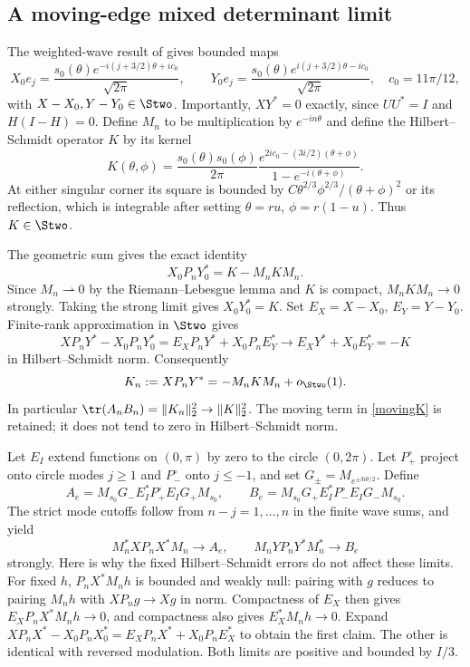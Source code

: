 \subsection{A moving-edge mixed determinant limit}
The weighted-wave result of \cite[Section 11]{r124} gives bounded maps
\[
 X_0e_j=\frac{s_0(\theta)e^{-i(j+3/2)\theta+ic_0}}{\sqrt{2\pi}},
 \qquad Y_0e_j=\frac{s_0(\theta)e^{i(j+3/2)\theta-ic_0}}{\sqrt{2\pi}},
 \quad c_0=11\pi/12,
\]
with $X-X_0,Y-Y_0\in\Stwo$. Importantly, $XY^*=0$ exactly,
since $UU^*=I$ and $H(I-H)=0$.
Define $M_n$ to be multiplication by $e^{-in\theta}$ and define the
Hilbert--Schmidt operator $K$ by its kernel
\begin{equation}\label{Kedge}
 K(\theta,\phi)=\frac{s_0(\theta)s_0(\phi)}{2\pi}
 \frac{e^{2ic_0-(3i/2)(\theta+\phi)}}{1-e^{-i(\theta+\phi)}}.
\end{equation}
At either singular corner its square is bounded by
$C\theta^{2/3}\phi^{2/3}/(\theta+\phi)^2$ or its reflection,
which is integrable after setting $\theta=ru$, $\phi=r(1-u)$.
Thus $K\in\Stwo$.

The geometric sum gives the exact identity
\[
 X_0P_nY_0^*=K-M_nKM_n.
\]
Since $M_n\rightharpoonup0$ by the Riemann--Lebesgue lemma and $K$
is compact, $M_nKM_n\to0$ strongly. Taking the strong limit gives
$X_0Y_0^*=K$. Set $E_X=X-X_0$, $E_Y=Y-Y_0$. Finite-rank approximation
in $\Stwo$ gives
\[
 XP_nY^*-X_0P_nY_0^*=E_XP_nY^*+X_0P_nE_Y^*
       \longrightarrow E_XY^*+X_0E_Y^*=-K
\]
in Hilbert--Schmidt norm. Consequently
\begin{equation}\label{movingK}
 K_n:=XP_nY^*=-M_nKM_n+o_{\Stwo}(1).
\end{equation}
In particular $\tr(A_nB_n)=\|K_n\|_2^2\to\|K\|_2^2$.
The moving term in \eqref{movingK} is retained; it does not tend to
zero in Hilbert--Schmidt norm.

Let $E_I$ extend functions on $(0,\pi)$ by zero to the circle
$(0,2\pi)$. Let $P_+^\circ$ project onto circle modes $j\ge1$ and
$P_-^\circ$ onto $j\le-1$, and set $G_\pm=M_{e^{\pm3i\theta/2}}$.
Define
\begin{equation}\label{edgeAB}
 A_e=M_{s_0}G_-E_I^*P_+^\circ E_IG_+M_{s_0},\qquad
 B_e=M_{s_0}G_+E_I^*P_-^\circ E_IG_-M_{s_0}.
\end{equation}
The strict mode cutoffs follow from $n-j=1,\ldots,n$ in the finite
wave sums, and yield
\begin{equation}\label{diagonallimits}
 M_n^*XP_nX^*M_n\longrightarrow A_e,\qquad
 M_nYP_nY^*M_n^*\longrightarrow B_e
\end{equation}
strongly. Here is why the fixed Hilbert--Schmidt errors do not affect
these limits. For fixed $h$, $P_nX^*M_nh$ is bounded and weakly null:
pairing with $g$ reduces to pairing $M_nh$ with $XP_ng\to Xg$ in
norm. Compactness of $E_X$ then gives
$E_XP_nX^*M_nh\to0$, and compactness also gives $E_X^*M_nh\to0$.
Expand $XP_nX^*-X_0P_nX_0^*=E_XP_nX^*+X_0P_nE_X^*$ to obtain
the first claim. The other is identical with reversed modulation.
Both limits are positive and bounded by $I/3$.

